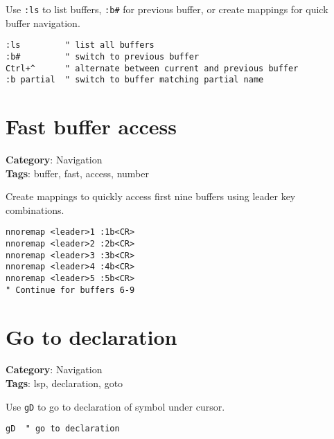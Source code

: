 {{{{{{{Use {\footnotesize \Verb§:ls§} to list buffers, {\footnotesize \Verb§:b#§} for previous buffer, or create mappings for quick buffer navigation.

\begin{Exa*}{}
\begin{Verbatim}[fontsize=\footnotesize, breaklines, breakanywhere]
:ls         " list all buffers
:b#         " switch to previous buffer
Ctrl+^      " alternate between current and previous buffer
:b partial  " switch to buffer matching partial name
\end{Verbatim}
\end{Exa*}

\section{Fast buffer access}

\textbf{Category}: Navigation\\ \textbf{Tags}: buffer, fast, access, number
\vspace{0.5cm}

Create mappings to quickly access first nine buffers using leader key combinations.

\begin{Exa*}{}
\begin{Verbatim}[fontsize=\footnotesize, breaklines, breakanywhere]
nnoremap <leader>1 :1b<CR>
nnoremap <leader>2 :2b<CR>
nnoremap <leader>3 :3b<CR>
nnoremap <leader>4 :4b<CR>
nnoremap <leader>5 :5b<CR>
" Continue for buffers 6-9
\end{Verbatim}
\end{Exa*}

\section{Go to declaration}

\textbf{Category}: Navigation\\ \textbf{Tags}: lsp, declaration, goto
\vspace{0.5cm}

Use {\footnotesize \Verb§gD§} to go to declaration of symbol under cursor.

\begin{Exa*}{}
\begin{Verbatim}[fontsize=\footnotesize, breaklines, breakanywhere]
gD  " go to declaration
\end{Verbatim}
\end{Exa*}

}}}}}}}
